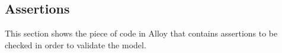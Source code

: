 \subsection{Assertions}

This section shows the piece of code in Alloy that contains assertions to be checked in order to validate the model.\\

